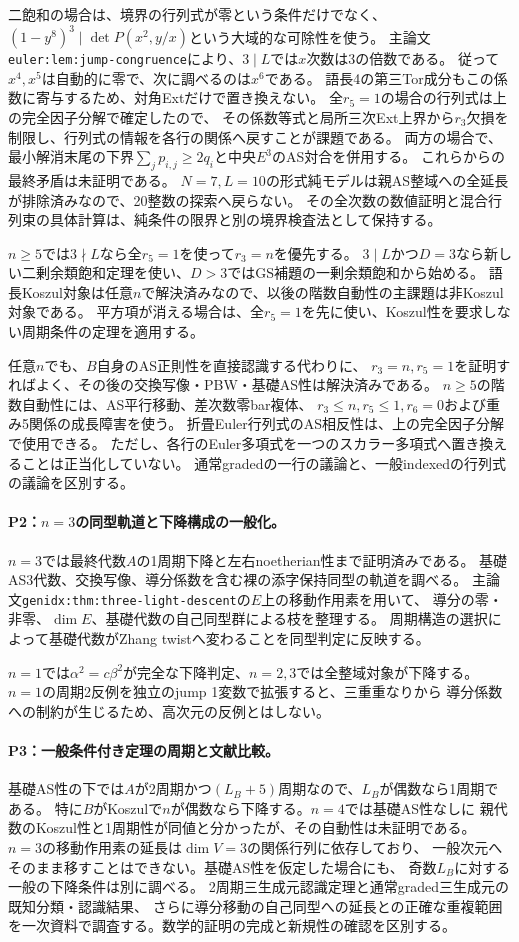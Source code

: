 \documentclass[11pt,a4paper]{ltjsarticle}
\begin{document}
二飽和の場合は、境界の行列式が零という条件だけでなく、
$(1-y^8)^3\mid\det P(x^2,y/x)$という大域的な可除性を使う。
主論文\texttt{euler:lem:jump-congruence}により、$3\mid L$では$x$次数は3の倍数である。
従って$x^4,x^5$は自動的に零で、次に調べるのは$x^6$である。
語長4の第三Tor成分もこの係数に寄与するため、対角Extだけで置き換えない。
全$r_5=1$の場合の行列式は上の完全因子分解で確定したので、
その係数等式と局所三次Ext上界から$r_3$欠損を制限し、行列式の情報を各行の関係へ戻すことが課題である。
両方の場合で、最小解消末尾の下界$\sum_jp_{i,j}\ge2q_i$と中央$E^3$のAS対合を併用する。
これらからの最終矛盾は未証明である。
$N=7,L=10$の形式純モデルは親AS整域への全延長が排除済みなので、20整数の探索へ戻らない。
その全次数の数値証明と混合行列束の具体計算は、純条件の限界と別の境界検査法として保持する。

$n\ge5$では$3\nmid L$なら全$r_5=1$を使って$r_3=n$を優先する。
$3\mid L$かつ$D=3$なら新しい二剰余類飽和定理を使い、$D>3$ではGS補題の一剰余類飽和から始める。
語長Koszul対象は任意$n$で解決済みなので、以後の階数自動性の主課題は非Koszul対象である。
平方項が消える場合は、全$r_5=1$を先に使い、Koszul性を要求しない周期条件の定理を適用する。

任意$n$でも、$B$自身のAS正則性を直接認識する代わりに、
$r_3=n,r_5=1$を証明すればよく、その後の交換写像・PBW・基礎AS性は解決済みである。
$n\ge5$の階数自動性には、AS平行移動、差次数零bar複体、
$r_3\le n,r_5\le1,r_6=0$および重み5関係の成長障害を使う。
折畳Euler行列式のAS相反性は、上の完全因子分解で使用できる。
ただし、各行のEuler多項式を一つのスカラー多項式へ置き換えることは正当化していない。
通常gradedの一行の議論と、一般indexedの行列式の議論を区別する。

\paragraph{P2：$n=3$の同型軌道と下降構成の一般化。}
$n=3$では最終代数$A$の1周期下降と左右noetherian性まで証明済みである。
基礎AS3代数、交換写像、導分係数を含む裸の添字保持同型の軌道を調べる。
主論文\texttt{genidx:thm:three-light-descent}の$E$上の移動作用素を用いて、
導分の零・非零、$\dim E$、基礎代数の自己同型群による枝を整理する。
周期構造の選択によって基礎代数がZhang twistへ変わることを同型判定に反映する。

$n=1$では$\alpha^2=c\beta^2$が完全な下降判定、$n=2,3$では全整域対象が下降する。
$n=1$の周期2反例を独立のjump 1変数で拡張すると、三重重なりから
導分係数への制約が生じるため、高次元の反例とはしない。

\paragraph{P3：一般条件付き定理の周期と文献比較。}
基礎AS性の下では$A$が2周期かつ$(L_B+5)$周期なので、$L_B$が偶数なら1周期である。
特に$B$がKoszulで$n$が偶数なら下降する。$n=4$では基礎AS性なしに
親代数のKoszul性と1周期性が同値と分かったが、その自動性は未証明である。
$n=3$の移動作用素の延長は$\dim V=3$の関係行列に依存しており、
一般次元へそのまま移すことはできない。基礎AS性を仮定した場合にも、
奇数$L_B$に対する一般の下降条件は別に調べる。
2周期三生成元認識定理と通常graded三生成元の既知分類・認識結果、
さらに導分移動の自己同型への延長との正確な重複範囲を一次資料で調査する。数学的証明の完成と新規性の確認を区別する。
\end{document}
